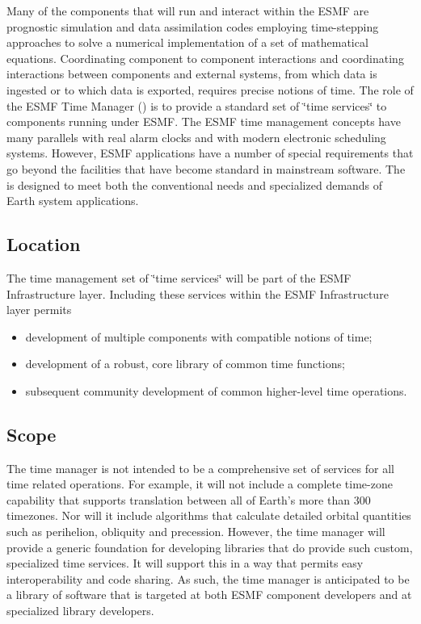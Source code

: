 
Many of the components that will run and interact within the ESMF
are prognostic simulation and data assimilation codes employing time-stepping 
approaches to solve a numerical implementation of a set of mathematical 
equations. Coordinating component to component interactions and coordinating 
interactions between components and external systems, from which data is 
ingested or to which data is exported, requires precise notions of time. The
role of the ESMF Time Manager (\funcname) is to provide a standard set 
of \char`\"{}time services\char`\"{}
to components running under ESMF. The ESMF time management concepts
have many parallels with real alarm clocks and with modern electronic
scheduling systems. However, ESMF applications have
a number of special requirements that go beyond the facilities that
have become standard in mainstream software. The \funcname is
designed to meet both the conventional needs and specialized demands
of Earth system applications.

\subsection{Location}

The time management set of \char`\"{}time services\char`\"{}
will be part of the ESMF Infrastructure layer. Including these services
within the ESMF Infrastructure layer permits

\begin{itemize}
\item development of multiple components with compatible notions of time;
\item development of a robust, core library of common time functions;
\item subsequent community development of common higher-level time operations.
\end{itemize}

\subsection{Scope}

The time manager is not intended to be a comprehensive set of services for
all time related operations. For example, it will not include a complete
time-zone capability that supports translation between all of Earth's 
more than 300 timezones. Nor will it include
algorithms that calculate detailed orbital quantities such as perihelion, 
obliquity and precession.
However, the time manager will provide a generic foundation for developing 
libraries that do provide such custom, specialized time services. It 
will support this in a way that permits easy interoperability and 
code sharing. As such, the time manager is anticipated to be a library of 
software that is targeted at both ESMF component developers and at specialized 
library developers.





